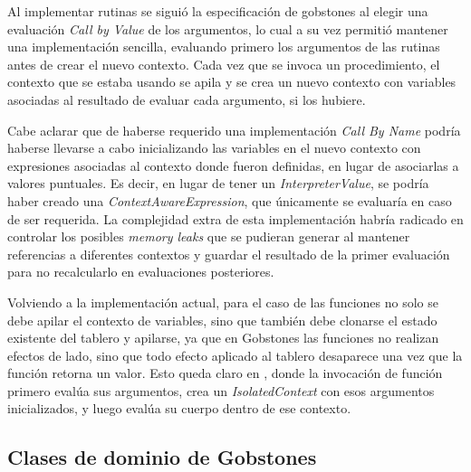 Al implementar rutinas se siguió la especificación de gobstones al elegir una evaluación \textit{Call by Value} \cite{DowekL11} de los argumentos, lo cual a su vez permitió mantener una implementación sencilla, evaluando primero los argumentos de las rutinas antes de crear el nuevo contexto. 
Cada vez que se invoca un procedimiento, el contexto que se estaba usando se apila y se crea un nuevo contexto con variables asociadas al resultado de evaluar cada argumento, si los hubiere. 

Cabe aclarar que de haberse requerido una implementación \textit{Call By Name} podría haberse llevarse a cabo inicializando las variables en el nuevo contexto con expresiones asociadas al contexto donde fueron definidas, en lugar de asociarlas a valores puntuales. Es decir, en lugar de tener un \textit{InterpreterValue}, se podría haber creado una \textit{ContextAwareExpression}, que únicamente se evaluaría en caso de ser requerida. La complejidad extra de esta implementación habría radicado en controlar los posibles \textit{memory leaks} que se pudieran generar al mantener referencias a diferentes contextos y guardar el resultado de la primer evaluación para no recalcularlo en evaluaciones posteriores.

Volviendo a la implementación actual, para el caso de las funciones no solo se debe apilar el contexto de variables, sino que también debe clonarse el estado existente del tablero y apilarse, ya que en Gobstones las funciones no realizan efectos de lado, sino que todo efecto aplicado al tablero desaparece una vez que la función retorna un valor. Esto queda claro en , donde la invocación de función primero evalúa sus argumentos, crea un \textit{IsolatedContext} con esos argumentos inicializados, y luego evalúa su cuerpo dentro de ese contexto.


\subsection{Clases de dominio de Gobstones}

